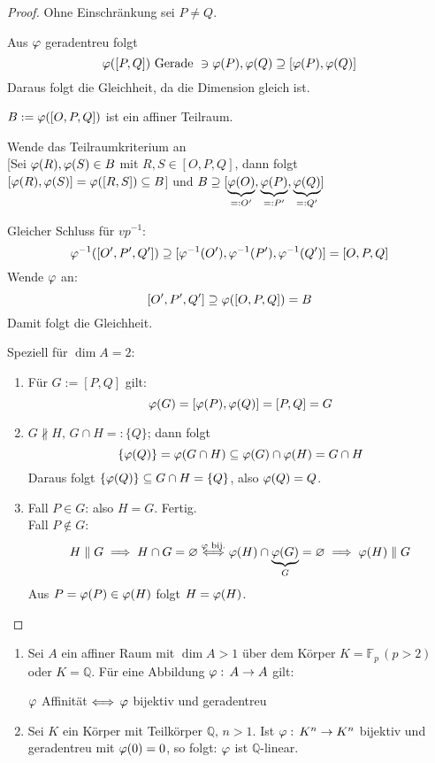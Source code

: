 \documentclass[parskip,a4paper,twoside,DIV15,BCOR12mm]{scrbook}
\begin{document}
\begin{proof}
Ohne Einschränkung sei \(P\neq Q\).

Aus \(\varphi\) geradentreu folgt 
\[
\varphi([P,Q])\text{ Gerade }\ni\varphi(P),\varphi(Q)\supseteq[\varphi(P),\varphi(Q)]
\]
Daraus folgt die Gleichheit, da die Dimension gleich ist.
\begin{thesis}
\(B:=\varphi([O,P,Q])\) ist ein affiner Teilraum.
\end{thesis}
Wende das Teilraumkriterium an\\
{[Sei \(\varphi(R),\varphi(S)\in B\) mit \(R,S\in[O,P,Q]\), dann folgt
    \([\varphi(R),\varphi(S)]=\varphi([R,S])\subseteq B\)]} und
\(B\supseteq[\underbrace{\varphi(O)}_{=:O'},\underbrace{\varphi(P)}_{=:P'},
    \underbrace{\varphi(Q)}_{=:Q'}]\)

Gleicher Schluss für \(vp^{-1}\):
\[
\varphi^{-1}([O',P',Q'])\supseteq[\varphi^{-1}(O'),\varphi^{-1}(P'),\varphi^{-1}(Q')]=[O,P,Q]
\]
Wende \(\varphi\) an:
\[
[O',P',Q']\supseteq\varphi([O,P,Q])=B
\]
Damit folgt die Gleichheit.

Speziell für \(\dim A=2\):
\begin{enumerate}
\item Für \(G:=[P,Q]\) gilt:
\[
\varphi(G)=[\varphi(P),\varphi(Q)]=[P,Q]=G
\]
\item \(G\not\parallel H,\,G\cap H=:\{Q\}\); dann folgt
\[
\{\varphi(Q)\}=\varphi(G\cap H)\subseteq\varphi(G)\cap\varphi(H)=G\cap H
\]
Daraus folgt \(\{\varphi(Q)\}\subseteq G\cap H=\{Q\}\), also \(\varphi(Q)=Q\).
\item Fall \(P\in G\): also \(H=G\). Fertig.\\
Fall \(P\not\in G\):
\[
H\parallel G\implies H\cap G=\varnothing
    \overset{\varphi\text{ bij.}}{\Longleftrightarrow}
\varphi(H)\cap\underbrace{\varphi(G)}_{G}=\varnothing\implies\varphi(H)\parallel G
\]
Aus \(P=\varphi(P)\in\varphi(H)\) folgt \(H=\varphi(H)\).
\end{enumerate}
\end{proof}
\begin{theo}
\label{Satz 21.5}
\begin{enumerate}
\item Sei \(A\) ein affiner Raum mit \(\dim A>1\) über dem Körper 
    \label{Satz 21.5 Behauptung 1}
\(K=\mathbb{F}_{p}\,(p>2)\) oder \(K=\mathbb{Q}\). Für eine Abbildung
\(\varphi:\,A\to A\) gilt:
\begin{center}
\(\varphi\) Affinität \(\Longleftrightarrow\,\varphi\) bijektiv und geradentreu
\end{center}
\item Sei \(K\) ein Körper mit Teilkörper \(\mathbb{Q},\,n>1\). Ist
    \label{Satz 21.5 Behauptung 2}
\(\varphi:\,K^{n}\to K^{n}\) bijektiv und geradentreu mit \(\varphi(0)=0\), so folgt:
\(\varphi\) ist \(\mathbb{Q}\)-linear.
\end{enumerate}
\end{theo}
\end{document}
